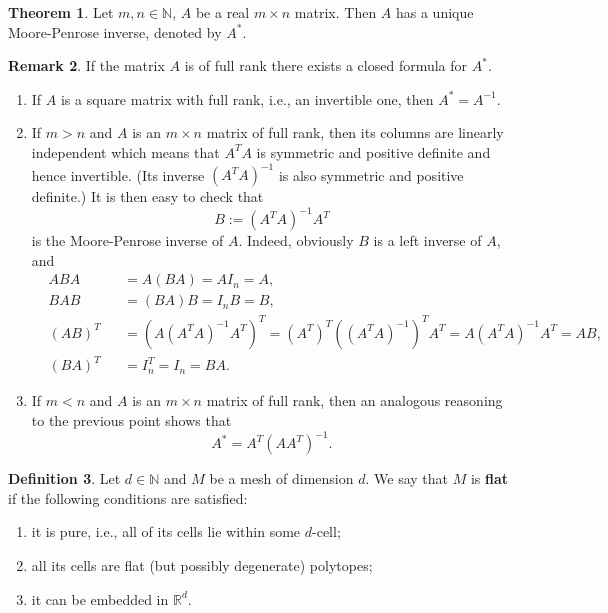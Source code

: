 \documentclass[fleqn]{article}
\theoremstyle{definition}
\newtheorem{theorem}{Theorem}[section]
\newtheorem{definition}[theorem]{Definition}
\newtheorem{remark}[theorem]{Remark}
\newcommand{\N}{\mathbb{N}}
\newcommand{\R}{\mathbb{R}}
\begin{document}
\begin{theorem}
  Let $m, n \in \N$, $A$ be a real $m \times n$ matrix.
  Then $A$ has a unique Moore-Penrose inverse, denoted by $A^*$.
\end{theorem}

\begin{remark}
  If the matrix $A$ is of full rank there exists a closed formula for $A^*$.
  \begin{enumerate}
    \item
      If $A$ is a square matrix with full rank, i.e., an invertible one, then
      $A^* = A^{-1}$.
    \item
      If $m > n$ and $A$ is an $m \times n$ matrix of full rank, then its
      columns are linearly independent which means that $A^T A$ is
      symmetric and positive definite and hence invertible.
      (Its inverse $(A^T A)^{-1}$ is also symmetric and positive definite.)
      It is then easy to check that
      \begin{equation}
        B := (A^T A)^{-1} A^T
      \end{equation}
      is the Moore-Penrose inverse of $A$.
      Indeed, obviously $B$ is a left inverse of $A$, and 
      \begin{subequations}
        \begin{alignat}{2}
          & A B A && = A (B A) = A I_n = A, \\
          & B A B && = (B A) B = I_n B = B, \\
          & (A B)^T && = (A (A^T A)^{-1} A^T)^T
            = (A^T)^T ((A^T A)^{-1})^T A^T = A (A^T A)^{-1} A^T = A B, \\
          & (B A)^T && = I_n^T = I_n = B A.
        \end{alignat}
      \end{subequations}
    \item
      If $m < n$ and $A$ is an $m \times n$ matrix of full rank, then an
      analogous reasoning to the previous point shows that
      \begin{equation}
        A^* = A^T (A A^T)^{-1}.
      \end{equation}
  \end{enumerate}
\end{remark}

\begin{definition}
  Let $d\in \N$ and $M$ be a mesh of dimension $d$.
  We say that $M$ is \textbf{flat} if the following conditions are satisfied:
  \begin{enumerate}
    \item
      it is pure, i.e., all of its cells lie within some $d$-cell;
    \item
      all its cells are flat (but possibly degenerate) polytopes;
    \item
      it can be embedded in $\R^d$.
  \end{enumerate}
\end{definition}
\end{document}
